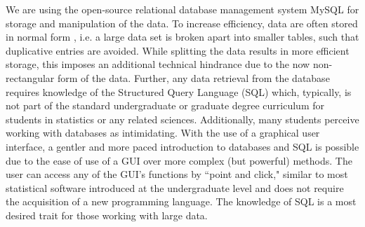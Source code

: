 \documentclass[11pt]{tise_style}
\begin{document}
We are using the open-source relational database management system MySQL \citep{mysql} for %
storage and manipulation of the data. To increase efficiency, data are often stored in normal form \citep{normalform:1983}, i.e. a large data set is broken apart into smaller  tables, such that duplicative entries are avoided. While splitting the data results in  more efficient storage, this imposes an additional technical hindrance due to the now non-rectangular form of the data. Further, any data retrieval from the database requires knowledge of the Structured Query Language (SQL) which, typically, is not part of the standard undergraduate or graduate degree curriculum for students in statistics or any related sciences. Additionally,  many students perceive working with databases as intimidating. With the use of a graphical user interface, a gentler and more paced introduction to databases and SQL is possible due to the ease of use of a GUI over more complex (but powerful) methods.  The user can access any of the GUI's functions by ``point and click," similar to most statistical software introduced at the undergraduate level and does not require the acquisition of a new programming language.  The knowledge of SQL is a most desired trait for those working with large data.
\end{document}
